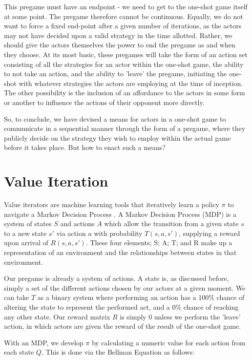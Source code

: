 This pregame must have an endpoint - we need to get to the one-shot game itself at some point. The pregame therefore cannot be continuous. Equally, we do not want to force a fixed end-point after a given number of iterations, as the actors may not have decided upon a valid strategy in the time allotted. Rather, we should give the actors themselves the power to end the pregame as and when they choose. At its most basic, these pregames will take the form of an action set consisting of all the strategies for an actor within the one-shot game, the ability to not take an action, and the ability to 'leave' the pregame, initiating the one-shot with whatever strategies the actors are employing at the time of inception. The other possibility is the inclusion of an affordance to the actors in some form or another to influence the actions of their opponent more directly.

So, to conclude, we have devised a means for actors in a one-shot game to communicate in a sequential manner through the form of a pregame, where they publicly decide on the strategy they wish to employ within the actual game before it takes place. But how to enact such a means?

\section{Value Iteration}\label{sec:VIintro}

Value iterators are machine learning tools that iteratively learn a policy $\pi$ to navigate a Markov Decision Process \cite{Bel}. A Markov Decision Process (MDP) is a system of states $S$ and actions $A$ which allow the transition from a given state $s$ to a new state $s'$ via action $a$ with probability $T(s, a, s')$, supplying a reward upon arrival of $R(s, a, s')$.\cite{kochenderfer2022algorithms} These four elements; S; A; T; and R make up a representation of an environment and the relationships between states in that environment.

Our pregame is already a system of actions. A state is, as discussed before, simply a set of the different actions chosen by our actors at a given moment. We can take $T$ as a binary system where performing an action has a 100\% chance of altering the state to represent the performed act, and a 0\% chance of reaching any other state. Our reward matrix $R$ is simply 0 unless we perform the 'leave' action, in which actors are given the reward of the result of the one-shot game.

With an MDP, we develop $\pi$ by calculating a numeric value for each action from each state $Q$. This is done via the Bellman Equation as follows:


